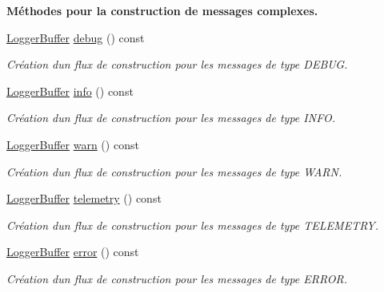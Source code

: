 \begin{Indent}\textbf{ Méthodes pour la construction de messages complexes.}\par
\begin{DoxyCompactItemize}
\item 
\hyperlink{classlogs_1_1Logger_1_1LoggerBuffer}{Logger\+Buffer} \hyperlink{classlogs_1_1Logger_aade259b85b4978c3b69fcdcc12a5974a}{debug} () const
\begin{DoxyCompactList}\small\item\em Création d\textquotesingle{}un flux de construction pour les messages de type D\+E\+B\+UG. \end{DoxyCompactList}\item 
\hyperlink{classlogs_1_1Logger_1_1LoggerBuffer}{Logger\+Buffer} \hyperlink{classlogs_1_1Logger_abe904448829b4235e8452cbd19b35f45}{info} () const
\begin{DoxyCompactList}\small\item\em Création d\textquotesingle{}un flux de construction pour les messages de type I\+N\+FO. \end{DoxyCompactList}\item 
\hyperlink{classlogs_1_1Logger_1_1LoggerBuffer}{Logger\+Buffer} \hyperlink{classlogs_1_1Logger_a2741020406e22491e124f646c6cf39a7}{warn} () const
\begin{DoxyCompactList}\small\item\em Création d\textquotesingle{}un flux de construction pour les messages de type W\+A\+RN. \end{DoxyCompactList}\item 
\hyperlink{classlogs_1_1Logger_1_1LoggerBuffer}{Logger\+Buffer} \hyperlink{classlogs_1_1Logger_a6a37df307f0264996d3cd72fac28411c}{telemetry} () const
\begin{DoxyCompactList}\small\item\em Création d\textquotesingle{}un flux de construction pour les messages de type T\+E\+L\+E\+M\+E\+T\+RY. \end{DoxyCompactList}\item 
\hyperlink{classlogs_1_1Logger_1_1LoggerBuffer}{Logger\+Buffer} \hyperlink{classlogs_1_1Logger_ac1468dbd9ac30bc400dafc0c6f69f971}{error} () const
\begin{DoxyCompactList}\small\item\em Création d\textquotesingle{}un flux de construction pour les messages de type E\+R\+R\+OR. \end{DoxyCompactList}\end{DoxyCompactItemize}
\end{Indent}


